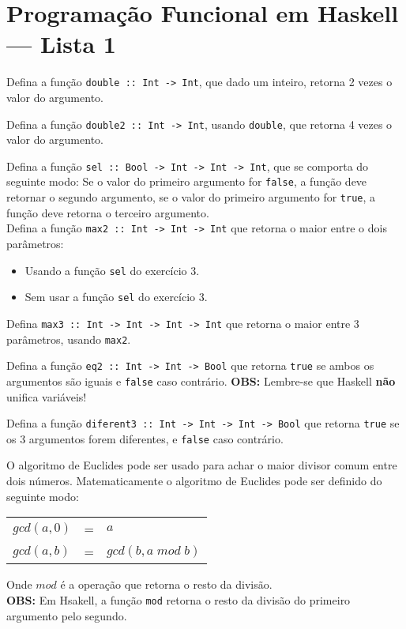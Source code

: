 \documentclass[a4paper,11pt]{exam}
\begin{document}
\topmargin=0pt
\renewcommand{\solutiontitle}{\noident \textbf{Solução:} \par }

\section{Programação Funcional em Haskell --- Lista 1}
\begin{questions}

  \question Defina a função \texttt{double :: Int ->  Int}, que dado um inteiro, 
  retorna 2 vezes o valor do argumento.
  
  \question Defina a função  \texttt{double2 :: Int -> Int}, usando \texttt{double}, que
  retorna 4 vezes o valor do argumento.
  
  \question Defina a função \texttt{sel :: Bool -> Int -> Int -> Int}, que se comporta do
   seguinte modo: Se o valor do primeiro argumento for \texttt{false}, a função deve retornar o segundo 
   argumento, se o valor do primeiro argumento for \texttt{true}, a função deve retorna o terceiro argumento.\\

  \question Defina a função \texttt{max2 :: Int -> Int -> Int} que retorna o maior entre o dois parâmetros: 
   \begin{itemize}
      \item Usando a função \texttt{sel} do exercício 3.
      \item Sem usar a função \texttt{sel} do exercício 3. 
   \end{itemize}
   
  \question Defina \texttt{max3 :: Int -> Int -> Int -> Int} que retorna o maior entre 3 parâmetros, usando
  \texttt{max2}.

  \question Defina a função \texttt{eq2 :: Int -> Int -> Bool} que retorna \texttt{true} se ambos os argumentos
   são iguais e \texttt{false} caso contrário. \textbf{OBS:} Lembre-se que Haskell \textbf{não} unifica variáveis!

  \question Defina a função  \texttt{diferent3 :: Int -> Int -> Int -> Bool} que retorna \texttt{true} se os 3 argumentos
   forem diferentes, e \texttt{false} caso contrário. 
    
 
  \question  O algoritmo de Euclides pode ser usado para achar o maior divisor comum entre dois números.
  Matematicamente o algoritmo de Euclides pode ser definido do seguinte modo: 
   \begin{center} 
      \begin{tabular}{lcl}
         $gcd(a,0)$ & = & $a$ \\
         $gcd(a,b)$ & = & $gcd(b,a \;mod\; b)$\\
      \end{tabular}
   \end{center}
   Onde $mod$ é a operação que retorna o resto da divisão.\\ 
   \textbf{OBS:} Em Hsakell,  a função \texttt{mod} retorna o resto da divisão do primeiro
   argumento pelo segundo.
   \begin{parts}

\end{parts}
\end{questions}
\end{document}

